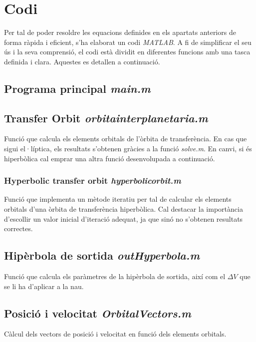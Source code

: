 \chapter{Codi}
\label{code}
Per tal de poder resoldre les equacions definides en els apartats anteriors de forma ràpida i eficient, s'ha elaborat un codi \textit{MATLAB}. A fi de simplificar el seu ús i la seva comprensió, el codi està dividit en diferentes funcions amb una tasca definida i clara. Aquestes es detallen a continuació.
\section[Programa principal]{Programa principal \textit{main.m}}

\section[Transfer Orbit]{Transfer Orbit \textit{orbitainterplanetaria.m}}
\label{interplanetari}
Funció que calcula els elements orbitals de l'òrbita de transferència. En cas que sigui el·líptica, els resultats s'obtenen gràcies a la funció \textit{solve.m}. En canvi, si és hiperbòlica cal emprar una altra funció desenvolupada a continuació.
\newpage 

\subsection[Hyperbolic transfer orbit]{Hyperbolic transfer orbit \textit{hyperbolicorbit.m}}
Funció que implementa un mètode iteratiu per tal de calcular els elements orbitals d'una òrbita de transferència hiperbòlica. Cal destacar la importància d'escollir un valor inicial d'iteració adequat, ja que sinó no s'obtenen resultats correctes.

\section[Hipèrbola de sortida]{Hipèrbola de sortida \textit{outHyperbola.m}}
\label{outHyperbola}
Funció que calcula els paràmetres de la hipèrbola de sortida, així com el $\Delta V$ que se li ha d'aplicar a la nau.

\newpage
\section[Posició i velocitat]{Posició i velocitat \textit{OrbitalVectors.m}}
\label{OrbitalVectors}
Càlcul dels vectors de posició i velocitat en funció dels elements orbitals.

